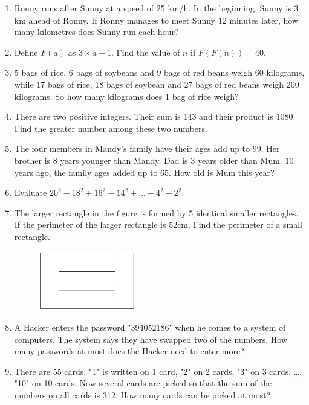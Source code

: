 \documentclass[11pt]{scrartcl}
\begin{document}
\begin{enumerate}
     \item Ronny runs after Sunny at a speed of 25 km/h. In the beginning, Sunny is 3 km ahead of Ronny. If Ronny manages to meet Sunny 12 minutes later, how many kilometres does Sunny run each hour?
    
     \item Define $F(a)$ as $3 \times a+1$. Find the value of $n$ if $F(F(n))=40$.
    
     \item 5 bags of rice, 6 bags of soybeans and 9 bags of red beans weigh 60 kilograms, while 17 bags of rice, 18 bags of soybean and 27 bags of red beans weigh 200 kilograms. So how many kilograms does 1 bag of rice weigh?
    
     \item There are two positive integers. Their sum is 143 and their product is 1080. Find the greater number among these two numbers.
    
     \item The four members in Mandy's family have their ages add up to 99. Her brother is 8 years younger than Mandy. Dad is 3 years older than Mum. 10 years ago, the family ages added up to 65. How old is Mum this year?
    
     \item Evaluate $20^2-18^2+16^2-14^2+\dots+4^2-2^2$.
     
    \newpage
    \item The larger rectangle in the figure is formed by 5 identical smaller rectangles. If the perimeter of the larger rectangle is $52$cm. Find the perimeter of a small rectangle. 
    \begin{figure}[h]
        \centering
        \includegraphics[width=0.4\textwidth]{StarGen/0Figure/5rect2.png}
    \end{figure}
    
     \item A Hacker enters the password "394052186" when he comes to a system of computers. The system says they have swapped two of the numbers. How many passwords at most does the Hacker need to enter more?

     \item There are 55 cards. "1" is written on 1 card, "2" on 2 cards, "3" on 3 cards, \ldots, "10" on 10 cards. Now several cards are picked so that the sum of the numbers on all cards is 312. How many cards can be picked at most?
    

\end{enumerate}
\end{document}
